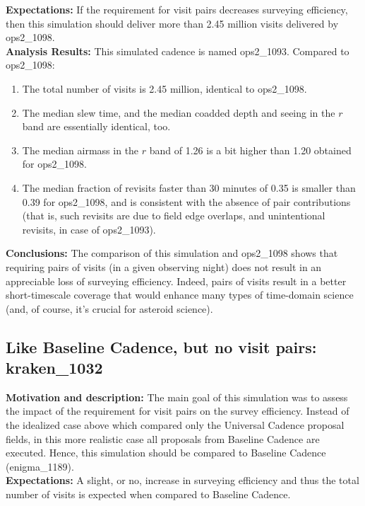 \documentclass[manuscript]{article}
\begin{document}
{\bf Expectations:} If the requirement for visit pairs decreases surveying efficiency, then 
this simulation should deliver more than 2.45 million visits delivered by ops2\_1098. \\

{\bf Analysis Results:} This simulated cadence is named ops2\_1093. Compared
to ops2\_1098:
\begin{enumerate}
\item The total number of visits is 2.45 million, identical to ops2\_1098. 
\item The median slew time, and the median coadded depth and seeing in the $r$ band
are essentially identical, too. 
\item The median airmass in the $r$ band of 1.26 is a bit higher than 1.20 obtained
for ops2\_1098. 
\item The median fraction of revisits faster than 30 minutes of 0.35 is smaller than 0.39
for ops2\_1098, and is consistent with the absence of pair contributions (that is, 
such revisits are due to field edge overlaps, and unintentional revisits, in case of ops2\_1093). 
\end{enumerate}

{\bf Conclusions:} 
The comparison of this simulation and ops2\_1098 shows that requiring
pairs of visits (in a given observing night) does not result in an appreciable loss of 
surveying efficiency. Indeed, pairs of visits result in a better short-timescale coverage 
that would enhance many types of time-domain science (and, of course, it's crucial
for asteroid science). 


\subsection{Like Baseline Cadence, but no visit pairs: kraken\_1032} 


{\bf Motivation and description:} 
The main goal of this simulation was to assess the impact of the requirement for visit pairs
on the survey efficiency. Instead of the idealized case above which compared only the 
Universal Cadence proposal fields, in this more realistic case all proposals from Baseline 
Cadence are executed. Hence, this simulation should be compared to Baseline Cadence 
(enigma\_1189). \\

{\bf Expectations:} A slight, or no, increase in surveying efficiency and thus the total 
number of visits is expected when compared to Baseline Cadence. \\
\end{document}

